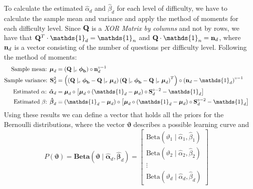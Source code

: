 \documentclass{article}
\newcommand{\0}{\mathbbold{0}}
\newcommand{\1}{\mathds{1}}
\newcommand{\Beta}[2]{\text{Beta}\!\left(#1,#2\right)}
\newcommand{\BBeta}[2]{\textbf{Beta}\!\left(#1,#2\right)}
\begin{document}
To calculate the estimated $\hat{\alpha}_d$ and $\hat{\beta}_d$ for each level of difficulty, we have to calculate the sample mean and variance and apply the method of moments for each difficulty level.
Since ${\bf Q}$ is a \textsl{XOR Matrix by columns} and not by rows, we have that ${\bf Q}^T \cdot \1_d = \1_n$ and ${\bf Q} \cdot \1_n = {\bf n}_d$, where ${\bf n}_d$ is a vector consisting of the number of questions per difficulty level.
Following the method of moments:
\begin{align*}
    \text{Sample mean: }{\boldsymbol \mu}_d &= \left( {\bf Q} \mid_c {\boldsymbol \phi}_{\bf b} \right) \circ {\bf n}_d^{\circ -1} \\
    \text{Sample variance: }{\bf S}_d^2 &= \left( \left({\bf Q} \mid_c {\boldsymbol \phi}_{\bf b} - {\bf Q} \mid_r {\boldsymbol \mu}_d\right)\left({\bf Q} \mid_c {\boldsymbol \phi}_{\bf b} - {\bf Q} \mid_r {\boldsymbol \mu}_d\right)^T \right) \circ \left( {\bf n}_d - \1_d \right)^{\circ -1} \\
    \text{Estimated }\alpha\text{: }\boldsymbol{\hat{\alpha}}_d &= {\boldsymbol \mu}_d \circ \left[ {\boldsymbol \mu}_d \circ \left( \1_d - {\boldsymbol \mu}_d \right) \circ {\bf S}_d^{\circ -2} - \1_d \right] \\
    \text{Estimated }\beta\text{: }\boldsymbol{\hat{\beta}}_d &= \left( \1_d - {\boldsymbol \mu}_d \right) \circ \left[ {\boldsymbol \mu}_d \circ \left( \1_d - {\boldsymbol \mu}_d \right) \circ {\bf S}_d^{\circ -2} - \1_d \right]
\end{align*}
Using these results we can define a vector that holds all the priors for the Bernoulli distributions, where the vector $\boldsymbol{\vartheta}$ describes a possible learning curve and
$$P({\boldsymbol \vartheta}) = \BBeta{\boldsymbol{\vartheta} \mid \boldsymbol{\hat{\alpha}}_d}{\boldsymbol{\hat{\beta}}_d} = \begin{bmatrix}
    \Beta{\vartheta_1 \mid \hat{\alpha}_1}{\hat{\beta}_1} \\
    \Beta{\vartheta_2 \mid \hat{\alpha}_2}{\hat{\beta}_2} \\
    \vdots \\
    \Beta{\vartheta_d \mid \hat{\alpha}_d}{\hat{\beta}_d}
\end{bmatrix} $$
\end{document}

